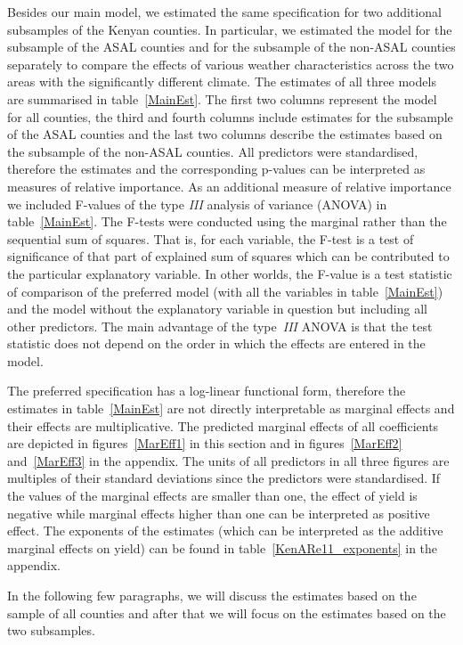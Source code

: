 \documentclass[12pt]{iopart}
\begin{document}
Besides our main model, we estimated the same specification for two additional subsamples of the Kenyan counties. In particular, we estimated the model for the subsample of the ASAL counties and for the subsample of the non-ASAL counties separately to compare the effects of various weather characteristics across the two areas with the significantly different climate. The estimates of all three models are summarised in table~\ref{MainEst}. The first two columns represent the model for all counties, the third and fourth columns include estimates for the subsample of the ASAL counties and the last two columns describe the estimates based on the subsample of the non-ASAL counties. All predictors were standardised, therefore the estimates and the corresponding p-values can be interpreted as measures of relative importance. As an additional measure of relative importance we included F-values of the type \textit{III} analysis of variance (ANOVA) in table~\ref{MainEst}. The F-tests were conducted using the marginal rather than the sequential sum of squares. That is, for each variable, the F-test is a test of significance of that part of explained sum of squares which can be contributed to the particular explanatory variable. In other worlds, the F-value is a test statistic of comparison of the preferred model (with all the variables in table~\ref{MainEst}) and the model without the explanatory variable in question but including all other predictors. The main advantage of the type~\textit{III} ANOVA is that the test statistic does not depend on the order in which the effects are entered in the model.

The preferred specification has a log-linear functional form, therefore the estimates in table~\ref{MainEst} are not directly interpretable as marginal effects and their effects are multiplicative. The predicted marginal effects of all coefficients are depicted in figures~\ref{MarEff1} in this section and in figures~\ref{MarEff2} and~\ref{MarEff3} in the appendix. The units of all predictors in all three figures are multiples of their standard deviations since the predictors were standardised. If the values of the marginal effects are smaller than one, the effect of yield is negative while marginal effects higher than one can be interpreted as positive effect. The exponents of the estimates (which can be interpreted as the additive marginal effects on yield) can be found in table~\ref{KenARe11_exponents} in the appendix.


In the following few paragraphs, we will discuss the estimates based on the sample of all counties and after that we will focus on the estimates based on the two subsamples.
\end{document}

